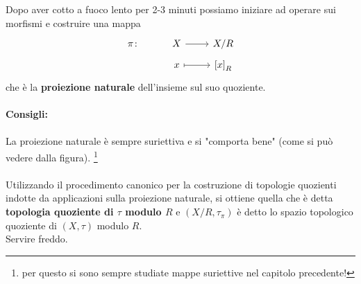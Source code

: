 Dopo aver cotto a fuoco lento per 2-3 minuti possiamo iniziare ad operare sui morfismi e costruire una mappa 
\begin{equation*}
\begin{tikzcd}[row sep = tiny]
	\pi  \colon &  X \arrow{r} & X/R \\
		 & x \arrow[mapsto]{r} & \left[x\right]_R
\end{tikzcd}
\end{equation*}
che è la \textbf{proiezione naturale} dell'insieme sul suo quoziente.\\  \\
 {\Large \textbf{Consigli:}} 
\\
\\
La proiezione naturale è sempre suriettiva  e si "comporta bene" (come si può vedere dalla figura).
\footnote{per questo si sono sempre studiate mappe suriettive nel capitolo precedente!}
 \\ \\ Utilizzando il procedimento canonico per la costruzione di topologie quozienti indotte da applicazioni sulla proiezione naturale, si ottiene quella che è detta \textbf{topologia quoziente di $\tau$ modulo $R$} e $(X/R, \tau_\pi)$ è detto lo spazio topologico quoziente di $(X,\tau)$ modulo $R$. \\
 Servire freddo.

